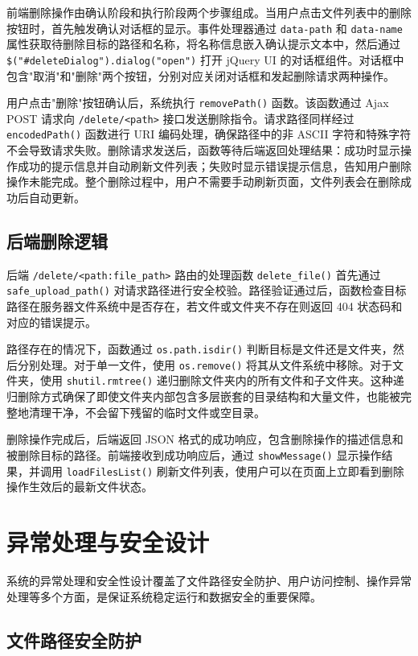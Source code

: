 \documentclass[UTF8,zihao=-4]{ctexrep}
\begin{document}
前端删除操作由确认阶段和执行阶段两个步骤组成。当用户点击文件列表中的删除按钮时，首先触发确认对话框的显示。事件处理器通过 \texttt{data-path} 和 \texttt{data-name} 属性获取待删除目标的路径和名称，将名称信息嵌入确认提示文本中，然后通过 \verb|$("#deleteDialog").dialog("open")| 打开 jQuery UI 的对话框组件。对话框中包含"取消"和"删除"两个按钮，分别对应关闭对话框和发起删除请求两种操作。

用户点击"删除"按钮确认后，系统执行 \texttt{removePath()} 函数。该函数通过 Ajax POST 请求向 \texttt{/delete/<path>} 接口发送删除指令。请求路径同样经过 \texttt{encodedPath()} 函数进行 URI 编码处理，确保路径中的非 ASCII 字符和特殊字符不会导致请求失败。删除请求发送后，函数等待后端返回处理结果：成功时显示操作成功的提示信息并自动刷新文件列表；失败时显示错误提示信息，告知用户删除操作未能完成。整个删除过程中，用户不需要手动刷新页面，文件列表会在删除成功后自动更新。

\subsection{后端删除逻辑}

后端 \texttt{/delete/<path:file\_path>} 路由的处理函数 \texttt{delete\_file()} 首先通过 \texttt{safe\_upload\_path()} 对请求路径进行安全校验。路径验证通过后，函数检查目标路径在服务器文件系统中是否存在，若文件或文件夹不存在则返回 404 状态码和对应的错误提示。

路径存在的情况下，函数通过 \texttt{os.path.isdir()} 判断目标是文件还是文件夹，然后分别处理。对于单一文件，使用 \texttt{os.remove()} 将其从文件系统中移除。对于文件夹，使用 \texttt{shutil.rmtree()} 递归删除文件夹内的所有文件和子文件夹。这种递归删除方式确保了即使文件夹内部包含多层嵌套的目录结构和大量文件，也能被完整地清理干净，不会留下残留的临时文件或空目录。

删除操作完成后，后端返回 JSON 格式的成功响应，包含删除操作的描述信息和被删除目标的路径。前端接收到成功响应后，通过 \texttt{showMessage()} 显示操作结果，并调用 \texttt{loadFilesList()} 刷新文件列表，使用户可以在页面上立即看到删除操作生效后的最新文件状态。


\section{异常处理与安全设计}

系统的异常处理和安全性设计覆盖了文件路径安全防护、用户访问控制、操作异常处理等多个方面，是保证系统稳定运行和数据安全的重要保障。

\subsection{文件路径安全防护}
\end{document}
